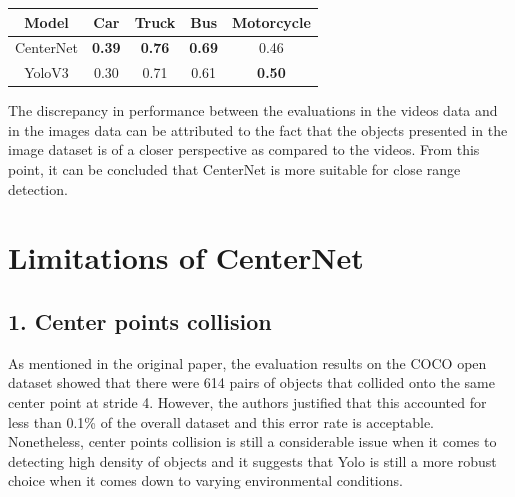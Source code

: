 \documentclass[12pt]{article}
\begin{document}
\begin{center}
\begin{tabular}{ |c|c|c|c|c| } 
\hline
Model & Car & Truck & Bus & Motorcycle \\
\hline
CenterNet & \textbf{0.39} & \textbf{0.76} & \textbf{0.69} & 0.46 \\ 
YoloV3 & 0.30 & 0.71 & 0.61 & \textbf{0.50} \\ 
\hline
\end{tabular}
\end{center}

The discrepancy in performance between the evaluations in the videos data and in the images data can be attributed to the fact that the objects presented in the image dataset is of a closer perspective as compared to the videos. From this point, it can be concluded that CenterNet is more suitable for close range detection.

\section*{Limitations of CenterNet}
\subsection*{1. Center points collision}
As mentioned in the original paper, the evaluation results on the COCO open dataset showed that there were 614 pairs of objects that collided onto the same center point at stride 4. However, the authors justified that this accounted for less than 0.1\% of the overall dataset and this error rate is acceptable. Nonetheless, center points collision is still a considerable issue when it comes to detecting high density of objects and it suggests that Yolo is still a more robust choice when it comes down to varying environmental conditions.
\end{document}
